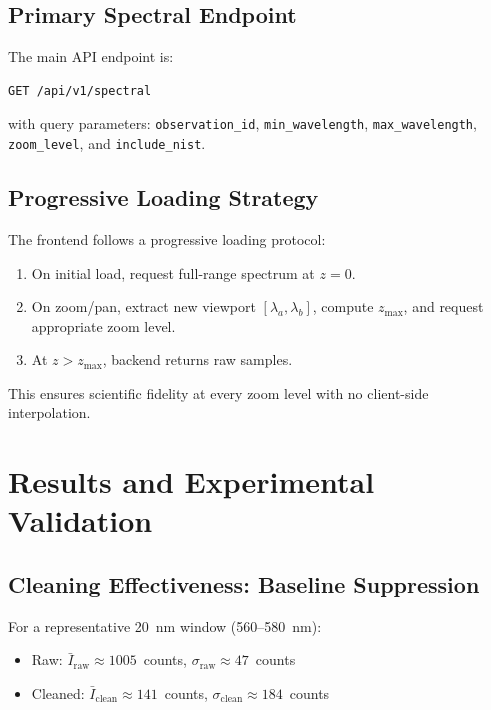 \documentclass[a4paper,twocolumn,10pt]{article}
\begin{document}
\subsection{Primary Spectral Endpoint}

The main API endpoint is:

\begin{verbatim}
GET /api/v1/spectral
\end{verbatim}

with query parameters: \texttt{observation\_id},
\texttt{min\_wavelength}, \texttt{max\_wavelength},
\texttt{zoom\_level}, and \texttt{include\_nist}.

\subsection{Progressive Loading Strategy}

The frontend follows a progressive loading protocol:

\begin{enumerate}[nosep,leftmargin=*]
  \item On initial load, request full-range spectrum at $z = 0$.
  \item On zoom/pan, extract new viewport $[\lambda_a, \lambda_b]$,
    compute $z_{\max}$, and request appropriate zoom level.
  \item At $z > z_{\max}$, backend returns raw samples.
\end{enumerate}

This ensures scientific fidelity at every zoom level with no
client-side interpolation.


\section{Results and Experimental Validation}
\label{sec:results}

\subsection{Cleaning Effectiveness: Baseline Suppression}

For a representative 20~nm window (560--580~nm):

\begin{itemize}[nosep,leftmargin=*]
  \item Raw: $\bar{I}_{\text{raw}} \approx 1005$~counts,
    $\sigma_{\text{raw}} \approx 47$~counts
  \item Cleaned: $\bar{I}_{\text{clean}} \approx 141$~counts,
    $\sigma_{\text{clean}} \approx 184$~counts
\end{itemize}
\end{document}
